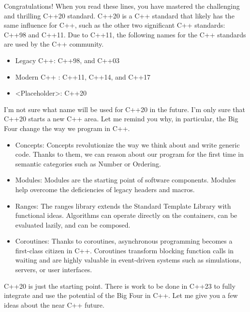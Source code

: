 Congratulations! When you read these lines, you have mastered the challenging and thrilling C++20 standard. C++20 is a C++ standard that likely has the same influence for C++, such as the other two significant C++ standards: C++98 and C++11. Due to C++11, the following names for the C++ standards are used by the C++ community.

\begin{itemize}
\item 
Legacy C++: C++98, and C++03

\item 
Modern C++ : C++11, C++14, and C++17

\item 
<Placeholder>: C++20
\end{itemize}
	
I’m not sure what name will be used for C++20 in the future. I’m only sure that C++20 starts a new C++ area. Let me remind you why, in particular, the Big Four change the way we program in C++.

\begin{itemize}
\item 
Concepts: Concepts revolutionize the way we think about and write generic code. Thanks to them, we can reason about our program for the first time in semantic categories such as Number or Ordering.

\item 
Modules: Modules are the starting point of software components. Modules help overcome the deficiencies of legacy headers and macros.

\item 
Ranges: The ranges library extends the Standard Template Library with functional ideas.
Algorithms can operate directly on the containers, can be evaluated lazily, and can be composed.

\item 
Coroutines: Thanks to coroutines, asynchronous programming becomes a first-class citizen in C++. Coroutines transform blocking function calls in waiting and are highly valuable in event-driven systems such as simulations, servers, or user interfaces.
\end{itemize}

C++20 is just the starting point. There is work to be done in C++23 to fully integrate and use the potential of the Big Four in C++. Let me give you a few ideas about the near C++ future.

